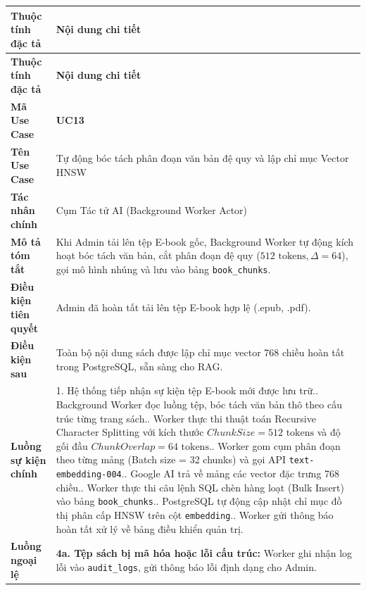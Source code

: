 \documentclass[11pt, a4paper]{report}
\begin{document}
\begin{longtable}{p{3.8cm} p{10.5cm}}
\toprule
\textbf{Thuộc tính đặc tả} & \textbf{Nội dung chi tiết} \\
\midrule
\endfirsthead
\toprule
\textbf{Thuộc tính đặc tả} & \textbf{Nội dung chi tiết} \\
\midrule
\endhead
\bottomrule
\endfoot
\textbf{Mã Use Case} & \textbf{UC13} \\
\midrule
\textbf{Tên Use Case} & Tự động bóc tách phân đoạn văn bản đệ quy và lập chỉ mục Vector HNSW \\
\midrule
\textbf{Tác nhân chính} & Cụm Tác tử AI (Background Worker Actor) \\
\midrule
\textbf{Mô tả tóm tắt} & Khi Admin tải lên tệp E-book gốc, Background Worker tự động kích hoạt bóc tách văn bản, cắt phân đoạn đệ quy ($512\text{ tokens}, \Delta=64$), gọi mô hình nhúng và lưu vào bảng \texttt{book\_chunks}. \\
\midrule
\textbf{Điều kiện tiên quyết} & Admin đã hoàn tất tải lên tệp E-book hợp lệ (.epub, .pdf). \\
\midrule
\textbf{Điều kiện sau} & Toàn bộ nội dung sách được lập chỉ mục vector 768 chiều hoàn tất trong PostgreSQL, sẵn sàng cho RAG. \\
\midrule
\textbf{Luồng sự kiện chính} & 
1. Hệ thống tiếp nhận sự kiện tệp E-book mới được lưu trữ.\newline
2. Background Worker đọc luồng tệp, bóc tách văn bản thô theo cấu trúc từng trang sách.\newline
3. Worker thực thi thuật toán Recursive Character Splitting với kích thước $ChunkSize = 512\text{ tokens}$ và độ gối đầu $ChunkOverlap = 64\text{ tokens}$.\newline
4. Worker gom cụm phân đoạn theo từng mảng (Batch size = 32 chunks) và gọi API \texttt{text-embedding-004}.\newline
5. Google AI trả về mảng các vector đặc trưng 768 chiều.\newline
6. Worker thực thi câu lệnh SQL chèn hàng loạt (Bulk Insert) vào bảng \texttt{book\_chunks}.\newline
7. PostgreSQL tự động cập nhật chỉ mục đồ thị phân cấp HNSW trên cột \texttt{embedding}.\newline
8. Worker gửi thông báo hoàn tất xử lý về bảng điều khiển quản trị. \\
\midrule
\textbf{Luồng ngoại lệ} & 
\textbf{4a. Tệp sách bị mã hóa hoặc lỗi cấu trúc:} Worker ghi nhận log lỗi vào \texttt{audit\_logs}, gửi thông báo lỗi định dạng cho Admin. \\
\bottomrule
\end{longtable}
\end{document}

